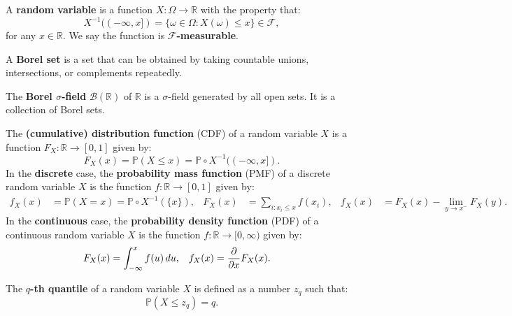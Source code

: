 \documentclass{huhtakm-template-book-v2}
\newcommand{\prob}{\mathbb{P}}
\begin{document}
    \begin{sdefn}
        A \textbf{random variable} is a function $X : \Omega \to \mathbb{R}$ with the property that:
        \begin{equation*}
            X^{-1}((-\infty, x]) = \{\omega \in \Omega : X(\omega) \leq x\} \in \mathcal{F},
        \end{equation*}
        for any $x \in \mathbb{R}$. We say the function is \textbf{$\mathcal{F}$-measurable}.
    \end{sdefn}
    \begin{sdefn}
        A \textbf{Borel set} is a set that can be obtained by taking countable unions, intersections, or complements repeatedly.
    \end{sdefn}
    \begin{sdefn}
        The \textbf{Borel $\sigma$-field} $\mathcal{B}(\mathbb{R})$ of $\mathbb{R}$ is a $\sigma$-field generated by all open sets. It is a collection of Borel sets.
    \end{sdefn}
    \begin{sdefn}
        The \textbf{(cumulative) distribution function} (CDF) of a random variable $X$ is a function $F_{X} : \mathbb{R} \to [0,1]$ given by:
        \begin{equation*}
            F_{X}(x) = \prob(X \leq x) = \prob \circ X^{-1}((-\infty, x]).
        \end{equation*}
        In the \textbf{discrete} case, the \textbf{probability mass function} (PMF) of a discrete random variable $X$ is the function $f : \mathbb{R} \to [0,1]$ given by:
        \begin{align*}
            f_{X}(x) &= \prob(X = x) = \prob \circ X^{-1}(\{x\}), & F_{X}(x) &= \sum_{i : x_{i} \leq x}f(x_{i}), & f_{X}(x) &= F_{X}(x) - \lim_{y \to x^{-}}F_{X}(y).
        \end{align*}
        In the \textbf{continuous} case, the \textbf{probability density function} (PDF) of a continuous random variable $X$ is the function $f : \mathbb{R} \to [0,\infty)$ given by:
        \begin{align*}
            F_{X}(x) &= \int_{-\infty}^{x}f(u)\,du, & f_{X}(x) &= \pdv*{F_{X}(x)}{x}.
        \end{align*}
    \end{sdefn}
    \begin{sdefn}
        The \textbf{$q$-th quantile} of a random variable $X$ is defined as a number $z_{q}$ such that:
        \begin{equation*}
            \prob(X \leq z_{q}) = q.
        \end{equation*}
    \end{sdefn}
    \newpage
\end{document}
